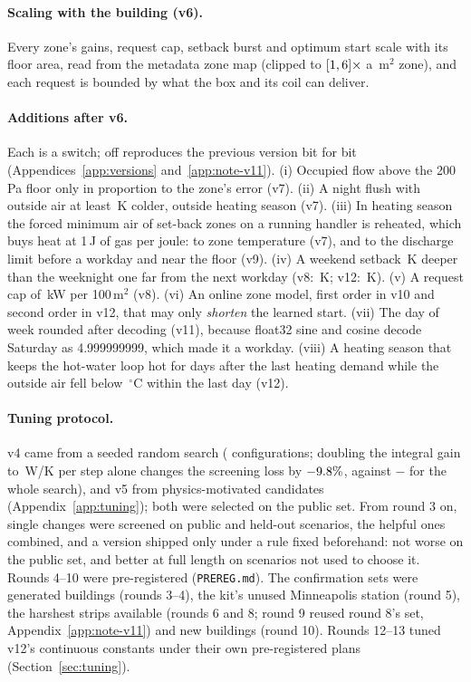 \documentclass{article}
\begin{document}
\paragraph{Scaling with the building (v6).} Every zone's gains, request cap, setback burst and optimum start scale with its floor area, read from the metadata zone map (clipped to $[1, 6]\times$ a \ParAreaRef\,m$^2$ zone), and each request is bounded by what the box and its coil can deliver.

\paragraph{Additions after v6.} Each is a switch; off reproduces the previous version bit for bit (Appendices~\ref{app:versions} and~\ref{app:note-v11}). (i) Occupied flow above the 200\,Pa floor only in proportion to the zone's error (v7). (ii) A night flush with outside air at least \ParRFFlushDt\,K colder, outside heating season (v7). (iii) In heating season the forced minimum air of set-back zones on a running handler is reheated, which buys heat at 1\,J of gas per joule: to zone temperature (v7), and to the discharge limit before a workday and near the floor (v9). (iv) A weekend setback \RTenWkExtLo\,K deeper than the weeknight one far from the next workday (v8: \RTenWkExtLoVEleven\,K; v12: \RTenWkExtLo\,K). (v) A request cap of \RFiveParQcapKw\,kW per 100\,m$^2$ (v8). (vi) An online zone model, first order in v10 and second order in v12, that may only \emph{shorten} the learned start. (vii) The day of week rounded after decoding (v11), because float32 sine and cosine decode Saturday as 4.999999999, which made it a workday. (viii) A heating season that keeps the hot-water loop hot for \RTenSeasonDays{} days after the last heating demand while the outside air fell below \RTenSeasonOatC\,$^\circ$C within the last day (v12).

\paragraph{Tuning protocol.} v4 came from a seeded random search (\NTuneConfigs{} configurations; doubling the integral gain to \ParKiWPerKStep\,W/K per step alone changes the screening loss by $-9.8\%$, against $-$\RElvTuneGain{} for the whole search), and v5 from \NCandV{} physics-motivated candidates (Appendix~\ref{app:tuning}); both were selected on the public set. From round 3 on, single changes were screened on public and held-out scenarios, the helpful ones combined, and a version shipped only under a rule fixed beforehand: not worse on the public set, and better at full length on scenarios not used to choose it. Rounds 4--10 were pre-registered (\texttt{PREREG.md}). The confirmation sets were generated buildings (rounds 3--4), the kit's unused Minneapolis station (round 5), the harshest strips available (rounds 6 and 8; round 9 reused round 8's set, Appendix~\ref{app:note-v11}) and new buildings (round 10). Rounds 12--13 tuned v12's continuous constants under their own pre-registered plans (Section~\ref{sec:tuning}).
\end{document}
